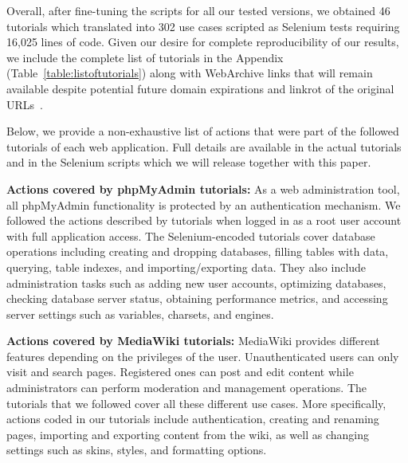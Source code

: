 Overall, after fine-tuning the scripts for all our tested versions, we obtained
46 tutorials which translated into 302 use cases scripted as Selenium tests
requiring 16,025 lines of code. Given our desire for complete reproducibility
of our results, we include the complete list of tutorials in the Appendix
(Table~\ref{table:listoftutorials}) along with WebArchive links that will
remain available despite potential future domain expirations and linkrot of
the original URLs~\cite{koehler2004longitudinal}.


Below, we provide a non-exhaustive list of actions that were part of the followed tutorials of each web application. Full details are available in the actual tutorials and in the Selenium scripts which we will release together with this paper.
\vspace{0.5ex}

\noindent \textbf{Actions covered by phpMyAdmin tutorials:} As a web administration tool, all phpMyAdmin functionality is protected by an authentication mechanism.
We followed the actions described by tutorials when logged in as a root user account with full application access. The Selenium-encoded tutorials cover database operations including creating and dropping databases, filling tables with data, querying, table indexes, and importing/exporting data.
They also include administration tasks such as adding new user accounts, optimizing databases, checking database server status, obtaining performance metrics, and accessing server settings such as variables, charsets, and engines.

\vspace{0.5ex}

\noindent \textbf{Actions covered by MediaWiki tutorials:} MediaWiki provides different features depending on the privileges of the user.
Unauthenticated users can only visit and search pages.
Registered ones can post and edit content while administrators can perform moderation and management operations.
The tutorials that we followed cover all these different use cases.
More specifically, actions coded in our tutorials include authentication, creating and renaming pages, importing and exporting content from the wiki, as well as changing settings such as skins, styles, and formatting options.

